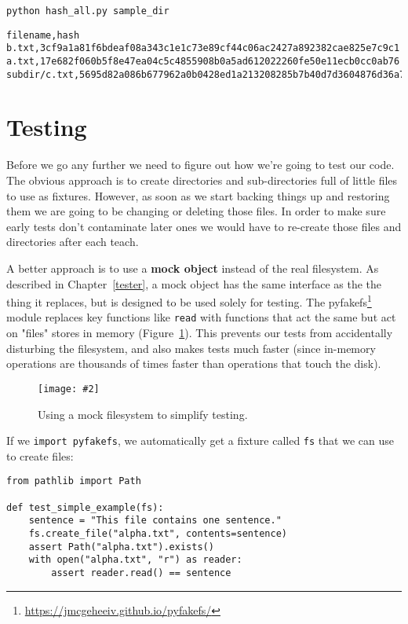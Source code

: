 \documentclass{scrbook}
\newcommand{\chapref}[1]{Chapter~\ref{#1}}
\newcommand{\figref}[1]{Figure~\ref{#1}}
\newcommand{\figpdf}[4]{\begin{figure}%
\centering%
\texttt{[image: \#2]}%
\caption{#3}%
\label{#1}%
\end{figure}}
\newcommand{\glossref}[1]{\textbf{#1}}
\newcommand{\hreffoot}[2]{{#1}\footnote{\href{#2}{#2}}}
\begin{document}
\begin{lstlisting}[frame=single,frameround=tttt]
python hash_all.py sample_dir
\end{lstlisting}



\begin{lstlisting}[frame=single,frameround=tttt]
filename,hash
b.txt,3cf9a1a81f6bdeaf08a343c1e1c73e89cf44c06ac2427a892382cae825e7c9c1
a.txt,17e682f060b5f8e47ea04c5c4855908b0a5ad612022260fe50e11ecb0cc0ab76
subdir/c.txt,5695d82a086b677962a0b0428ed1a213208285b7b40d7d3604876d36a710302a
\end{lstlisting}


\section{Testing}\label{backup-test}


Before we go any further
we need to figure out how we're going to test our code.
The obvious approach is to create directories and sub-directories full of little files to use as fixtures.
However,
as soon as we start backing things up and restoring them
we are going to be changing or deleting those files.
In order to make sure early tests don't contaminate later ones
we would have to re-create those files and directories after each teach.


A better approach is to use a \glossref{mock object}
instead of the real filesystem.
As described in \chapref{tester},
a mock object has the same interface as the the thing it replaces,
but is designed to be used solely for testing.
The \hreffoot{pyfakefs}{https://jmcgeheeiv.github.io/pyfakefs/} module replaces key functions like \texttt{read}
with functions that act the same
but act on "files" stores in memory
(\figref{backup-mock-fs}).
This prevents our tests from accidentally disturbing the filesystem,
and also makes tests much faster
(since in-memory operations are thousands of times faster than operations that touch the disk).

\figpdf{backup-mock-fs}{./backup/mock-fs.pdf}{Using a mock filesystem to simplify testing.}{0.6}


If we \texttt{import pyfakefs},
we automatically get a fixture called \texttt{fs}
that we can use to create files:


\begin{lstlisting}[frame=single,frameround=tttt]
from pathlib import Path

def test_simple_example(fs):
    sentence = "This file contains one sentence."
    fs.create_file("alpha.txt", contents=sentence)
    assert Path("alpha.txt").exists()
    with open("alpha.txt", "r") as reader:
        assert reader.read() == sentence
\end{lstlisting}
\end{document}
